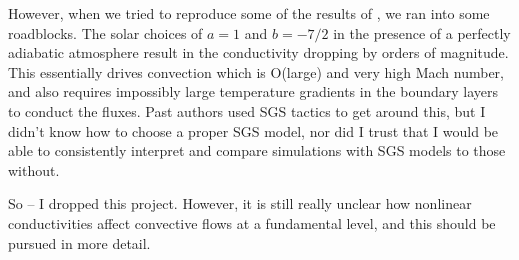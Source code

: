 However, when we tried to reproduce some of the results of \cite{kapyla&all2017}, we ran into some roadblocks.
The solar choices of $a = 1$ and $b = -7/2$ in the presence of a perfectly adiabatic atmosphere result in the conductivity dropping by orders of magnitude.
This essentially drives convection which is O(large) and very high Mach number, and also requires impossibly large temperature gradients in the boundary layers to conduct the fluxes.
Past authors used SGS tactics to get around this, but I didn't know how to choose a proper SGS model, nor did I trust that I would be able to consistently interpret and compare simulations with SGS models to those without.

So -- I dropped this project.
However, it is still really unclear how nonlinear conductivities affect convective flows at a fundamental level, and this should be pursued in more detail.

